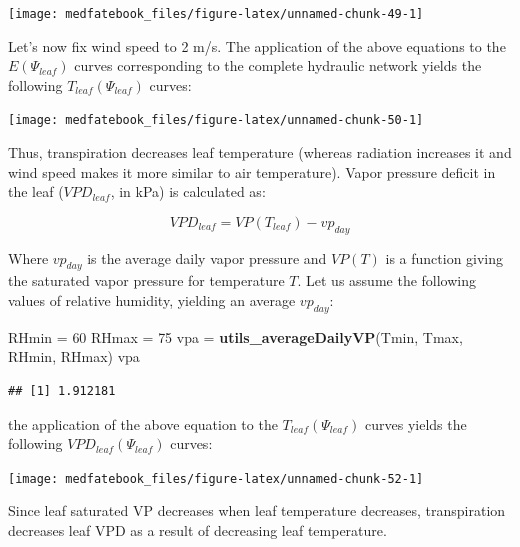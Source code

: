 \documentclass[]{book}
\newenvironment{Shaded}{\begin{snugshade}}{\end{snugshade}}
\newcommand{\KeywordTok}[1]{\textcolor[rgb]{0.13,0.29,0.53}{\textbf{#1}}}
\newcommand{\DecValTok}[1]{\textcolor[rgb]{0.00,0.00,0.81}{#1}}
\newcommand{\StringTok}[1]{\textcolor[rgb]{0.31,0.60,0.02}{#1}}
\newcommand{\NormalTok}[1]{#1}
\begin{document}
\begin{center}\texttt{[image: medfatebook\_files/figure-latex/unnamed-chunk-49-1]} \end{center}

Let's now fix wind speed to 2 m/s. The application of the above
equations to the \(E(\Psi_{leaf})\) curves corresponding to the complete
hydraulic network yields the following \(T_{leaf}(\Psi_{leaf})\) curves:

\begin{center}\texttt{[image: medfatebook\_files/figure-latex/unnamed-chunk-50-1]} \end{center}

Thus, transpiration decreases leaf temperature (whereas radiation
increases it and wind speed makes it more similar to air temperature).
Vapor pressure deficit in the leaf (\(VPD_{leaf}\), in kPa) is
calculated as:

\begin{equation}
VPD_{leaf} = VP(T_{leaf})-vp_{day}
\end{equation}

Where \(vp_{day}\) is the average daily vapor pressure and \(VP(T)\) is
a function giving the saturated vapor pressure for temperature \(T\).
Let us assume the following values of relative humidity, yielding an
average \(vp_{day}\):

\begin{Shaded}
\begin{Highlighting}[]
\NormalTok{RHmin =}\StringTok{ }\DecValTok{60}
\NormalTok{RHmax =}\StringTok{ }\DecValTok{75}
\NormalTok{vpa =}\StringTok{ }\KeywordTok{utils_averageDailyVP}\NormalTok{(Tmin, Tmax, RHmin, RHmax)}
\NormalTok{vpa}
\end{Highlighting}
\end{Shaded}

\begin{verbatim}
## [1] 1.912181
\end{verbatim}

the application of the above equation to the \(T_{leaf}(\Psi_{leaf})\)
curves yields the following \(VPD_{leaf}(\Psi_{leaf})\) curves:

\begin{center}\texttt{[image: medfatebook\_files/figure-latex/unnamed-chunk-52-1]} \end{center}

Since leaf saturated VP decreases when leaf temperature decreases,
transpiration decreases leaf VPD as a result of decreasing leaf
temperature.
\end{document}
